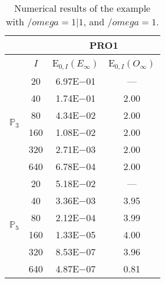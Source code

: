 \begin{table}[H]
\caption{Numerical results of the example with $/omega=1|1$, and $/omega=1$.}
\setlength{\tabcolsep}{5pt}
\centering
\begin{tabular}{@{}l c c c@{}}
\toprule
 &  & \multicolumn{2}{c}{PRO1}\\
\midrule
 & $I$ & E$_{0,I}(E_{\infty})$ & E$_{0,I}(O_{\infty})$\\
\midrule
\multirow{6}{*}{$\mathbb{P}_{3}$}
 & 20 & 6.97E$-$01 & ---\\
 & 40 & 1.74E$-$01 & 2.00\\
 & 80 & 4.34E$-$02 & 2.00\\
 & 160 & 1.08E$-$02 & 2.00\\
 & 320 & 2.71E$-$03 & 2.00\\
 & 640 & 6.78E$-$04 & 2.00\\
\midrule
\multirow{6}{*}{$\mathbb{P}_{5}$}
 & 20 & 5.18E$-$02 & ---\\
 & 40 & 3.36E$-$03 & 3.95\\
 & 80 & 2.12E$-$04 & 3.99\\
 & 160 & 1.33E$-$05 & 4.00\\
 & 320 & 8.53E$-$07 & 3.96\\
 & 640 & 4.87E$-$07 & 0.81\\
\bottomrule
\end{tabular}
\label{Table:PRO:test_01_01_test27_pro1}
\end{table}

